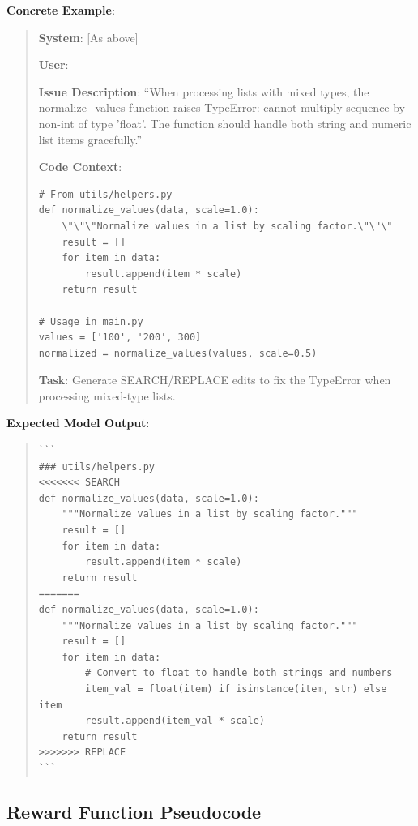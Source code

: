 \documentclass{article} %
\begin{document}
\textbf{Concrete Example}:

\begin{quote}
\small
\textbf{System}: [As above]

\textbf{User}:

\vspace{0.2cm}

\textbf{Issue Description}:
``When processing lists with mixed types, the normalize\_values function raises TypeError: cannot multiply sequence by non-int of type 'float'. The function should handle both string and numeric list items gracefully.''

\textbf{Code Context}:

\begin{verbatim}
# From utils/helpers.py
def normalize_values(data, scale=1.0):
    \"\"\"Normalize values in a list by scaling factor.\"\"\"
    result = []
    for item in data:
        result.append(item * scale)
    return result

# Usage in main.py
values = ['100', '200', 300]
normalized = normalize_values(values, scale=0.5)
\end{verbatim}

\textbf{Task}: Generate SEARCH/REPLACE edits to fix the TypeError when processing mixed-type lists.

\end{quote}

\textbf{Expected Model Output}:

\begin{quote}
\small
\begin{verbatim}
```
### utils/helpers.py
<<<<<<< SEARCH
def normalize_values(data, scale=1.0):
    """Normalize values in a list by scaling factor."""
    result = []
    for item in data:
        result.append(item * scale)
    return result
=======
def normalize_values(data, scale=1.0):
    """Normalize values in a list by scaling factor."""
    result = []
    for item in data:
        # Convert to float to handle both strings and numbers
        item_val = float(item) if isinstance(item, str) else item
        result.append(item_val * scale)
    return result
>>>>>>> REPLACE
```
\end{verbatim}
\end{quote}

\subsection{Reward Function Pseudocode}
\end{document}
